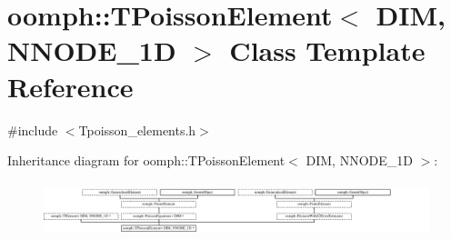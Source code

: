 \hypertarget{classoomph_1_1TPoissonElement}{}\section{oomph\+:\+:T\+Poisson\+Element$<$ D\+IM, N\+N\+O\+D\+E\+\_\+1D $>$ Class Template Reference}
\label{classoomph_1_1TPoissonElement}


{\ttfamily \#include $<$Tpoisson\+\_\+elements.\+h$>$}

Inheritance diagram for oomph\+:\+:T\+Poisson\+Element$<$ D\+IM, N\+N\+O\+D\+E\+\_\+1D $>$\+:\begin{figure}[H]
\begin{center}
\leavevmode
\includegraphics[height=1.588652cm]{classoomph_1_1TPoissonElement}
\end{center}
\end{figure}
